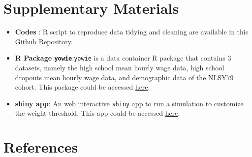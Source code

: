\documentclass[12pt]{article}
\begin{document}
\hypertarget{supplementary-materials}{%
\section{Supplementary Materials}\label{supplementary-materials}}

\begin{itemize}
\item
  \textbf{Codes} : R script to reproduce data tidying and cleaning are available in this \href{https://github.com/numbats/yowie/blob/master/data-raw/data_preprocessing.R}{Github Repository}.
\item
  \textbf{R Package \texttt{yowie}}:\texttt{yowie} is a data container R package that contains 3 datasets, namely the high school mean hourly wage data, high school dropouts mean hourly wage data, and demographic data of the NLSY79 cohort. This package could be accessed \href{https://github.com/numbats/yowie}{here}.
\item
  \textbf{shiny app}: An web interactive \texttt{shiny} app to run a simulation to customize the weight threshold. This app could be accessed \href{https://github.com/numbats/summer-wages-refresh/tree/main/app}{here}.
\end{itemize}

\hypertarget{references}{%
\section*{References}\label{references}}
\end{document}
